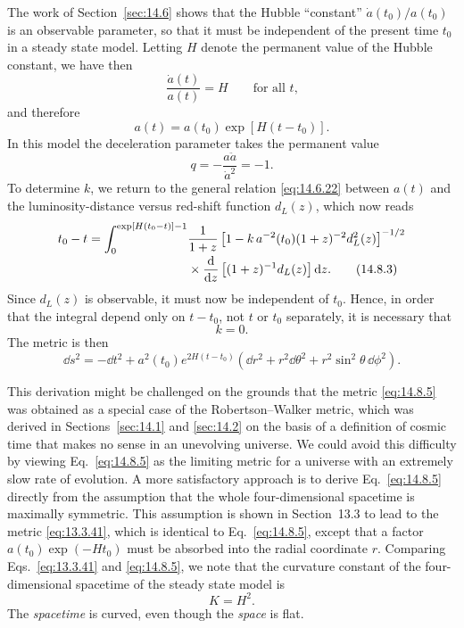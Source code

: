 The work of Section~\ref{sec:14.6} shows that the Hubble ``constant''
\(\dot a(t_0)/a(t_0)\) is an observable parameter, so that it must be
independent of the present time \(t_0\) in a steady state model. Letting
\(H\) denote the permanent value of the Hubble constant, we have then
\[
  \frac{\dot a(t)}{a(t)}=H
  \qquad\text{for all \(t\),}
\]
and therefore
\begin{equation}
  a(t)=a(t_0)\exp[H(t-t_0)].
  \tag{14.8.1}\label{eq:14.8.1}
\end{equation}
In this model the deceleration parameter takes the permanent value
\begin{equation}
  q=-\frac{a\ddot a}{\dot a^2}=-1.
  \tag{14.8.2}\label{eq:14.8.2}
\end{equation}
To determine \(k\), we return to the general relation
\eqref{eq:14.6.22} between \(a(t)\) and the luminosity-distance versus
red-shift function \(d_L(z)\), which now reads
\begin{align}
  t_0-t
  =
  \int_0^{\exp[H(t_0-t)]-1}
  &\frac{1}{1+z}
  \left[
    1-k\,a^{-2}(t_0)(1+z)^{-2}d_L^2(z)
  \right]^{-1/2}
  \notag\\[-2pt]
  &{}\times
  \frac{\mathop{}\!\mathrm{d}}{\mathop{}\!\mathrm{d} z}
  \left[
    (1+z)^{-1}d_L(z)
  \right]\mathop{}\!\mathrm{d} z.
  \tag{14.8.3}\label{eq:14.8.3}
\end{align}
Since \(d_L(z)\) is observable, it must now be independent of \(t_0\).
Hence, in order that the integral depend only on \(t-t_0\), not \(t\) or
\(t_0\) separately, it is necessary that
\begin{equation}
  k=0.
  \tag{14.8.4}\label{eq:14.8.4}
\end{equation}
The metric is then
\begin{equation}
  \dd s^2
  =
  -\dd t^2
  +
  a^2(t_0)e^{2H(t-t_0)}
  \left(
    \dd r^2+r^2\dd\theta^2+r^2\sin^2\theta\,\dd\phi^2
  \right).
  \tag{14.8.5}\label{eq:14.8.5}
\end{equation}

This derivation might be challenged on the grounds that the metric
\eqref{eq:14.8.5} was obtained as a special case of the
Robertson--Walker metric, which was derived in Sections~\ref{sec:14.1} and
\ref{sec:14.2} on the basis of a definition of cosmic time that makes no
sense in an unevolving universe. We could avoid this difficulty by viewing
Eq.~\eqref{eq:14.8.5} as the limiting metric for a universe with an
extremely slow rate of evolution. A more satisfactory approach is to derive
Eq.~\eqref{eq:14.8.5} directly from the assumption that the whole
four-dimensional spacetime is maximally symmetric. This assumption is shown
in Section~13.3 to lead to the metric \eqref{eq:13.3.41}, which is identical
to Eq.~\eqref{eq:14.8.5}, except that a factor
\(a(t_0)\exp(-Ht_0)\) must be absorbed into the radial coordinate \(r\).
Comparing Eqs.~\eqref{eq:13.3.41} and \eqref{eq:14.8.5}, we note that the
curvature constant of the four-dimensional spacetime of the steady state
model is
\begin{equation}
  K=H^2.
  \tag{14.8.6}\label{eq:14.8.6}
\end{equation}
The \emph{spacetime} is curved, even though the \emph{space} is flat.

